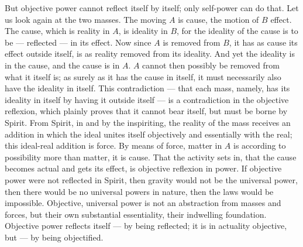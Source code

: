 \documentclass[12pt,a4paper]{book}
\begin{document}
But objective power cannot reflect itself by itself; only self-power can do that.
Let us look again at the two masses. The moving $A$ is cause, the motion of $B$
effect. The cause, which is reality in $A$, is ideality in $B$, for the ideality of
the cause is to be --- reflected --- in its effect. Now since $A$ is removed from
$B$, it has as cause its effect outside itself, is as reality removed from its
ideality. And yet the ideality is in the cause, and the cause is in $A$. $A$ cannot
then possibly be removed from what it itself is; as surely as it has the cause in
itself, it must necessarily also have the ideality in itself. This contradiction ---
that each mass, namely, has its ideality in itself by having it outside itself ---
is a contradiction in the objective reflexion, which plainly proves that it cannot
bear itself, but must be borne by Spirit. From Spirit, in and by the inspiriting,
the reality of the mass receives an addition in which the ideal unites itself
objectively and essentially with the real; this ideal-real addition is force. By
means of force, matter in $A$ is
according to possibility more than matter, it is cause. That the activity sets in,
that the cause becomes actual and gets its effect, is objective reflexion in power.
If objective power were not reflected in Spirit, then gravity would not be the
universal power, then there would be no universal powers in nature, then the laws
would be impossible. Objective, universal power is not an abstraction from masses
and forces, but their own substantial essentiality, their indwelling foundation.
Objective power reflects itself --- by being
reflected; it is in actuality objective, but --- by being objectified.
\end{document}
